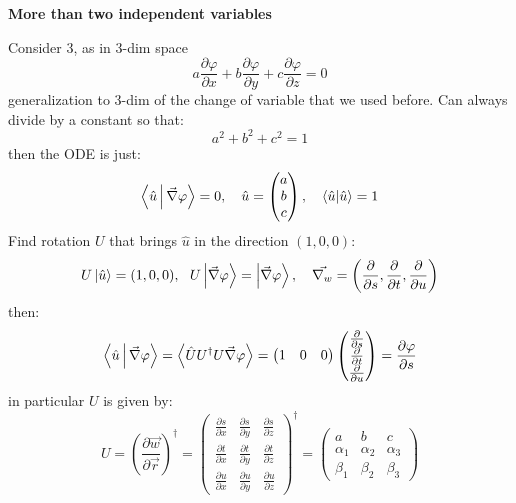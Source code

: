 \documentclass{article}
\newcommand{\vp}{\varphi}
\begin{document}
\noindent
\textbf{More than two independent variables}

\vspace{3mm}\noindent
Consider 3, as in 3-dim space 
\begin{equation}
 a \frac{\partial \vp}{\partial x} + b \frac{\partial \vp}{\partial y} + c \frac{\partial \vp}{\partial z} = 0
\end{equation}
generalization to 3-dim of the change of variable that we used before. Can always divide by a constant so
that:
\begin{equation}
    a^2 + b^2 + c^2 =1
\end{equation}
then the ODE is just:
\begin{equation}
    \Braket{\hat{u}|\vec{\nabla}\vp} = 0 , \quad \hat{u} = \begin{pmatrix}
        a\\b\\c
    \end{pmatrix}, \quad \braket{\hat{u}} = 1
\end{equation}
Find rotation $U$ that brings $\hat{u}$ in the direction $(1,0,0)$:
\begin{equation}
    U\ket{\hat{u}} = (1, 0, 0), \ \ U \ket{\vec{\nabla} \vp} = \ket{\vec{\nabla} \vp}, \quad \vec{\nabla_w} = \left(\frac{\partial}{\partial s},\frac{\partial}{\partial t},\frac{\partial}{\partial u}\right)
\end{equation}
then:
\begin{equation}
    \Braket{\hat{u}|\vec{\nabla}\vp} = \Braket{\hat{U} U^\dagger U \vec{\nabla} \vp} = \begin{pmatrix}
        1&0&0
    \end{pmatrix} \begin{pmatrix}
        \frac{\partial}{\partial s}\\\frac{\partial}{\partial t}\\\frac{\partial}{\partial u}
    \end{pmatrix} = \frac{\partial \vp}{\partial s}
\end{equation}
in particular $U$ is given by:
\begin{equation}
    U = \left( \frac{\partial \vec{w}}{\partial \vec{r}} \right)^{\dagger}
= 
\begin{pmatrix}
\frac{\partial s}{\partial x} & \frac{\partial s}{\partial y} & \frac{\partial s}{\partial z} \\
\frac{\partial t}{\partial x} & \frac{\partial t}{\partial y} & \frac{\partial t}{\partial z} \\
\frac{\partial u}{\partial x} & \frac{\partial u}{\partial y} & \frac{\partial u}{\partial z}
\end{pmatrix}^{\dagger}
=
\begin{pmatrix}
a & b & c \\
\alpha_1 & \alpha_2 & \alpha_3 \\
\beta_1 & \beta_2 & \beta_3
\end{pmatrix}
\end{equation}
\end{document}
